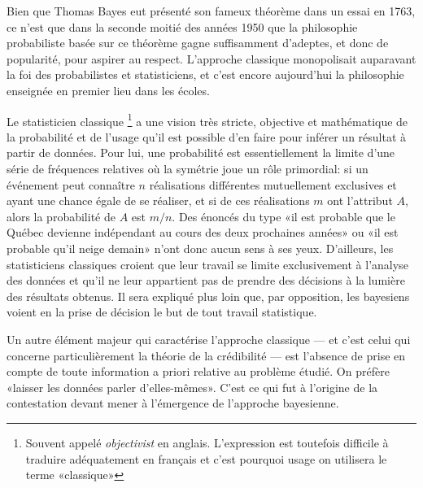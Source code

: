 Bien que Thomas Bayes eut présenté son fameux théorème dans un essai
en 1763, ce n'est que dans la seconde moitié des années 1950 que la
philosophie probabiliste basée sur ce théorème gagne suffisamment
d'adeptes, et donc de popularité, pour aspirer au respect. L'approche
classique monopolisait auparavant la foi des probabilistes et
statisticiens, et c'est encore aujourd'hui la philosophie enseignée en
premier lieu dans les écoles.

Le statisticien classique%
\footnote{Souvent appelé \emph{objectivist} en anglais. L'expression
  est toutefois difficile à traduire adéquatement en français et c'est
  pourquoi usage on utilisera le terme «classique»} %
a une vision très stricte, objective et mathématique de la probabilité
et de l'usage qu'il est possible d'en faire pour inférer un résultat à
partir de données. Pour lui, une probabilité est essentiellement la
limite d'une série de fréquences relatives où la symétrie joue un rôle
primordial: si un événement peut connaître $n$ réalisations
différentes mutuellement exclusives et ayant une chance égale de se
réaliser, et si de ces réalisations $m$ ont l'attribut $A$, alors la
probabilité de $A$ est $m/n$. Des énoncés du type «il est probable que
le Québec devienne indépendant au cours des deux prochaines années» ou
«il est probable qu'il neige demain» n'ont donc aucun sens à ses yeux.
D'ailleurs, les statisticiens classiques croient que leur travail se
limite exclusivement à l'analyse des données et qu'il ne leur
appartient pas de prendre des décisions à la lumière des résultats
obtenus. Il sera expliqué plus loin que, par opposition, les bayesiens
voient en la prise de décision le but de tout travail statistique.

Un autre élément majeur qui caractérise l'approche classique --- et
c'est celui qui concerne particulièrement la théorie de la crédibilité
--- est l'absence de prise en compte de toute information a priori
relative au problème étudié. On préfère «laisser les données parler
d'elles-mêmes». C'est ce qui fut à l'origine de la contestation devant
mener à l'émergence de l'approche bayesienne.


